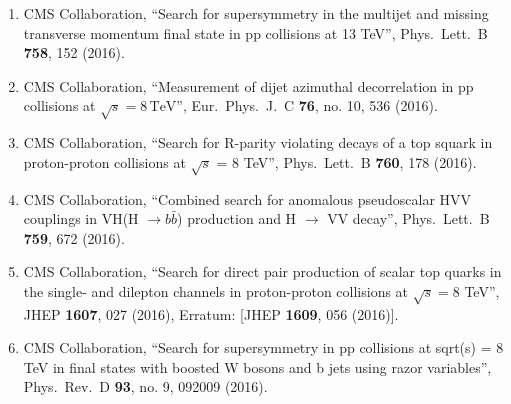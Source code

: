 \begin{enumerate}
\item CMS Collaboration, ``Search for supersymmetry in the multijet and missing transverse momentum final state in pp collisions at 13 TeV'', Phys.\ Lett.\ B {\bf 758}, 152 (2016).

\item CMS Collaboration, ``Measurement of dijet azimuthal decorrelation in pp collisions at $\sqrt{s}=8\,\mathrm{TeV} $'', Eur.\ Phys.\ J.\ C {\bf 76}, no. 10, 536 (2016).

\item CMS Collaboration, ``Search for R-parity violating decays of a top squark in proton-proton collisions at $\sqrt{s}$ = 8 TeV'', Phys.\ Lett.\ B {\bf 760}, 178 (2016).

\item CMS Collaboration, ``Combined search for anomalous pseudoscalar HVV couplings in VH(H $\to b \bar b$) production and H $\to$ VV decay'', Phys.\ Lett.\ B {\bf 759}, 672 (2016).

\item CMS Collaboration, ``Search for direct pair production of scalar top quarks in the single- and dilepton channels in proton-proton collisions at $ \sqrt{s}=8 $ TeV'', JHEP {\bf 1607}, 027 (2016), Erratum: [JHEP {\bf 1609}, 056 (2016)].

\item CMS Collaboration, ``Search for supersymmetry in pp collisions at sqrt(s) = 8 TeV in final states with boosted W bosons and b jets using razor variables'', Phys.\ Rev.\ D {\bf 93}, no. 9, 092009 (2016).


\end{enumerate}

